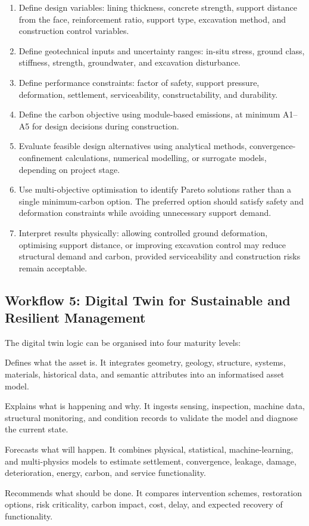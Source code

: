 \documentclass[11pt]{article}
\begin{document}
\begin{enumerate}
  \item Define design variables: lining thickness, concrete strength, support
  distance from the face, reinforcement ratio, support type, excavation method,
  and construction control variables.
  \item Define geotechnical inputs and uncertainty ranges: in-situ stress,
  ground class, stiffness, strength, groundwater, and excavation disturbance.
  \item Define performance constraints: factor of safety, support pressure,
  deformation, settlement, serviceability, constructability, and durability.
  \item Define the carbon objective using module-based emissions, at minimum
  A1--A5 for design decisions during construction.
  \item Evaluate feasible design alternatives using analytical methods,
  convergence-confinement calculations, numerical modelling, or surrogate
  models, depending on project stage.
  \item Use multi-objective optimisation to identify Pareto solutions rather
  than a single minimum-carbon option. The preferred option should satisfy
  safety and deformation constraints while avoiding unnecessary support demand.
  \item Interpret results physically: allowing controlled ground deformation,
  optimising support distance, or improving excavation control may reduce
  structural demand and carbon, provided serviceability and construction risks
  remain acceptable.
\end{enumerate}

\subsection{Workflow 5: Digital Twin for Sustainable and Resilient Management}

The digital twin logic can be organised into four maturity levels:

\begin{description}[leftmargin=34mm,style=nextline]
  \item[Descriptive twin] Defines what the asset is. It integrates geometry,
  geology, structure, systems, materials, historical data, and semantic
  attributes into an informatised asset model.
  \item[Reflective twin] Explains what is happening and why. It ingests sensing,
  inspection, machine data, structural monitoring, and condition records to
  validate the model and diagnose the current state.
  \item[Predictive twin] Forecasts what will happen. It combines physical,
  statistical, machine-learning, and multi-physics models to estimate settlement,
  convergence, leakage, damage, deterioration, energy, carbon, and service
  functionality.
  \item[Prescriptive twin] Recommends what should be done. It compares
  intervention schemes, restoration options, risk criticality, carbon impact,
  cost, delay, and expected recovery of functionality.
\end{description}
\end{document}
